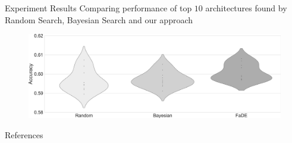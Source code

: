 \documentclass[]{beamer}
\makeatletter
\let\beamer@writeslidentry@miniframeson=\beamer@writeslidentry
\def\beamer@writeslidentry@miniframesoff{%
  \expandafter\beamer@ifempty\expandafter{\beamer@framestartpage}{}%
  {%
    \clearpage\beamer@notesactions%
  }
}
\newcommand*{\miniframeson}{\let\beamer@writeslidentry=\beamer@writeslidentry@miniframeson}
\newcommand*{\miniframesoff}{\let\beamer@writeslidentry=\beamer@writeslidentry@miniframesoff}
\makeatother
\begin{document}
\begin{frame}{Experiment Results}
\vspace{10pt}
Comparing performance of top $10$ architectures found by Random Search, Bayesian Search and our approach
\vfill
\begin{figure}
    \begin{center}
    \includegraphics[scale=.22]{graphics/benchmark.png}
    \caption{}
  \end{center} 
\end{figure}
\end{frame}

\miniframesoff
\begin{frame}{References}


\end{frame}

\miniframeson
\end{document}
